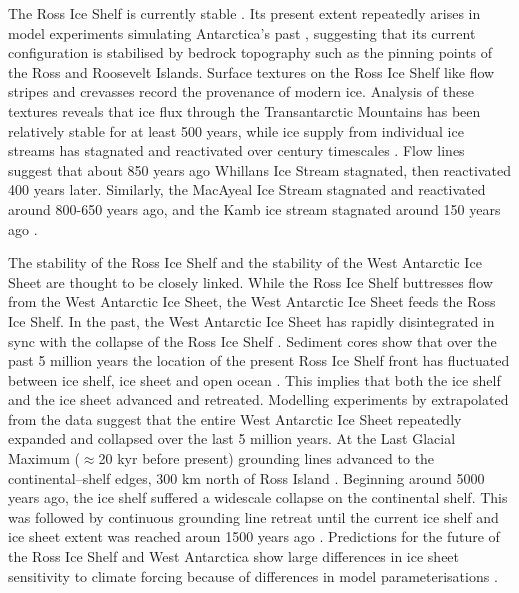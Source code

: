 The Ross Ice Shelf is currently stable \citep{paolo2015volume}.  Its present extent repeatedly arises in model experiments simulating Antarctica's past \citep{pollard2009modelling}, suggesting that its current configuration is stabilised by bedrock topography such as the pinning points of the Ross and Roosevelt Islands. Surface textures on the Ross Ice Shelf like flow stripes and crevasses record the provenance of modern ice. Analysis of these textures reveals that ice flux through the Transantarctic Mountains has been relatively stable for at least 500 years, while ice supply from individual ice streams has stagnated and reactivated over century timescales \citep{hulbe2007century}. Flow lines suggest that about 850 years ago Whillans Ice Stream stagnated, then reactivated 400 years later. Similarly, the MacAyeal Ice Stream stagnated and reactivated around 800-650 years ago, and the Kamb ice stream stagnated around 150 years ago \citep{hulbe2007century}.

The stability of the Ross Ice Shelf and the stability of the West Antarctic Ice Sheet are thought to be closely linked. While the Ross Ice Shelf buttresses flow from the West Antarctic Ice Sheet, the West Antarctic Ice Sheet feeds the Ross Ice Shelf. In the past, the West Antarctic Ice Sheet has rapidly disintegrated in sync with the collapse of the Ross Ice Shelf \citep{pollard2009modelling}. 
Sediment cores  show that over the past 5 million years the location of the present Ross Ice Shelf front has fluctuated between ice shelf, ice sheet and open ocean \citep{naish2009obliquity}. This implies that both the ice shelf and the ice sheet advanced and retreated.
Modelling experiments by \cite{pollard2009modelling} extrapolated from the \cite{naish2009obliquity} data suggest that the entire West Antarctic Ice Sheet repeatedly expanded and collapsed over the last 5 million years.
At the Last Glacial Maximum ($\approx$20 kyr before present) grounding lines advanced to the continental--shelf edges, 300 km north of Ross Island  \citep{mckay2008retreat} .
Beginning around 5000 years ago, the ice shelf suffered a widescale collapse  on the continental shelf. This was followed by continuous grounding line retreat until the current ice shelf and ice sheet extent was reached aroun 1500 years ago \citep{yokoyama2016widespread}. 
Predictions for the future of the Ross Ice Shelf and West Antarctica show large differences in ice sheet sensitivity to climate forcing because of differences in model parameterisations \citep{deconto2016contribution,golledge2015multi,edwards2021projected}.

